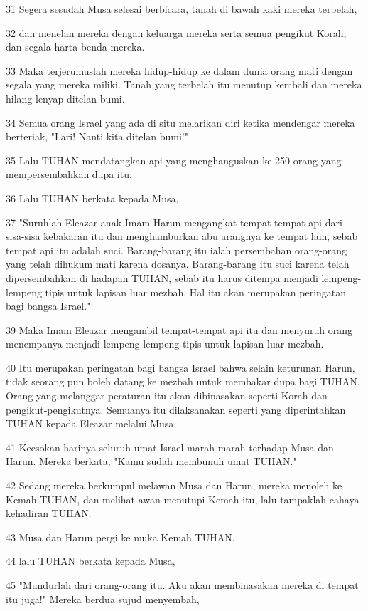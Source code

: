\par 31 Segera sesudah Musa selesai berbicara, tanah di bawah kaki mereka terbelah,
\par 32 dan menelan mereka dengan keluarga mereka serta semua pengikut Korah, dan segala harta benda mereka.
\par 33 Maka terjerumuslah mereka hidup-hidup ke dalam dunia orang mati dengan segala yang mereka miliki. Tanah yang terbelah itu menutup kembali dan mereka hilang lenyap ditelan bumi.
\par 34 Semua orang Israel yang ada di situ melarikan diri ketika mendengar mereka berteriak, "Lari! Nanti kita ditelan bumi!"
\par 35 Lalu TUHAN mendatangkan api yang menghanguskan ke-250 orang yang mempersembahkan dupa itu.
\par 36 Lalu TUHAN berkata kepada Musa,
\par 37 "Suruhlah Eleazar anak Imam Harun mengangkat tempat-tempat api dari sisa-sisa kebakaran itu dan menghamburkan abu arangnya ke tempat lain, sebab tempat api itu adalah suci. Barang-barang itu ialah persembahan orang-orang yang telah dihukum mati karena dosanya. Barang-barang itu suci karena telah dipersembahkan di hadapan TUHAN, sebab itu harus ditempa menjadi lempeng-lempeng tipis untuk lapisan luar mezbah. Hal itu akan merupakan peringatan bagi bangsa Israel."
\par 39 Maka Imam Eleazar mengambil tempat-tempat api itu dan menyuruh orang menempanya menjadi lempeng-lempeng tipis untuk lapisan luar mezbah.
\par 40 Itu merupakan peringatan bagi bangsa Israel bahwa selain keturunan Harun, tidak seorang pun boleh datang ke mezbah untuk membakar dupa bagi TUHAN. Orang yang melanggar peraturan itu akan dibinasakan seperti Korah dan pengikut-pengikutnya. Semuanya itu dilaksanakan seperti yang diperintahkan TUHAN kepada Eleazar melalui Musa.
\par 41 Keesokan harinya seluruh umat Israel marah-marah terhadap Musa dan Harun. Mereka berkata, "Kamu sudah membunuh umat TUHAN."
\par 42 Sedang mereka berkumpul melawan Musa dan Harun, mereka menoleh ke Kemah TUHAN, dan melihat awan menutupi Kemah itu, lalu tampaklah cahaya kehadiran TUHAN.
\par 43 Musa dan Harun pergi ke muka Kemah TUHAN,
\par 44 lalu TUHAN berkata kepada Musa,
\par 45 "Mundurlah dari orang-orang itu. Aku akan membinasakan mereka di tempat itu juga!" Mereka berdua sujud menyembah,
